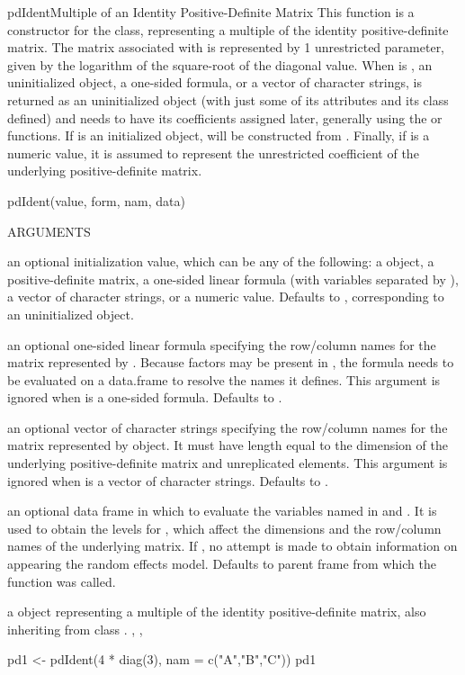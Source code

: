 \documentclass[pdftex]{article} \usepackage{url,graphicx}
\begin{document}
\begin{Helpfile}{pdIdent}{Multiple of an Identity Positive-Definite Matrix}
This function is a constructor for the  class,
representing a multiple of the identity positive-definite matrix. 
The matrix associated with  is represented by 1
unrestricted parameter, given by the logarithm of the square-root of
the diagonal value. When  is 
, an uninitialized  object, a one-sided
formula, or a vector of character strings,  is returned
as an uninitialized  object (with just some of its
attributes and its class defined) and needs to have its coefficients
assigned later, generally using the  or 
functions. If  is an initialized  object,
 will be constructed from
. Finally, if  is a numeric value,
it is assumed to represent the unrestricted coefficient of the
underlying positive-definite  matrix.
\begin{Example}
pdIdent(value, form, nam, data)
\end{Example}
\begin{Argument}{ARGUMENTS}
\item[\Co{value:}]
an optional initialization value, which can be any of the
following: a  object, a positive-definite
matrix, a one-sided linear formula (with variables separated by
\Co{+}), a vector of character strings, or a numeric
value. Defaults to , corresponding
to an uninitialized object.
\item[\Co{form:}]
an optional one-sided linear formula specifying the
row/column names for the matrix represented by . Because
factors may be present in , the formula needs to be
evaluated on a data.frame to resolve the names it defines. This
argument is ignored when  is a one-sided
formula. Defaults to .
\item[\Co{nam:}]
an optional vector of character strings specifying the
row/column names for the matrix represented by object. It must have 
length equal to the dimension of the underlying positive-definite
matrix and unreplicated elements. This argument is ignored when
 is a vector of character strings. Defaults to
.
\item[\Co{data:}]
an optional data frame in which to evaluate the variables
named in  and . It is used to
obtain the levels for , which affect the
dimensions and the row/column names of the underlying matrix. If
, no attempt is made to obtain information on 
 appearing the random effects model. Defaults to parent
frame from which the function was called.
\end{Argument}
a  object representing a multiple of the identity
positive-definite matrix, also inheriting from class .
, ,
\need 15pt
\vspace{-16pt} 
\begin{Example}
pd1 <- pdIdent(4 * diag(3), nam = c("A","B","C"))
pd1
\end{Example}
\end{Helpfile}
\end{document}
